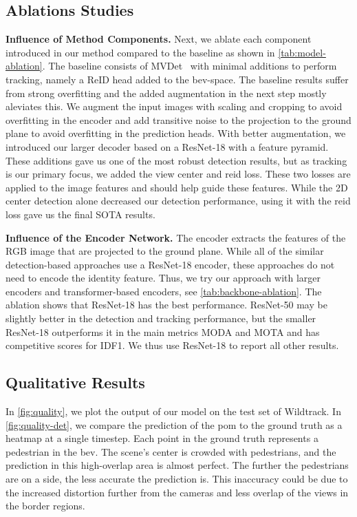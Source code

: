 \documentclass[10pt,twocolumn,letterpaper]{article}
\newcommand{\nparagraph}[1]{\noindent\textbf{#1.  }}
\begin{document}
\subsection{Ablations Studies}
\nparagraph{Influence of Method Components}
Next, we ablate each component introduced in our method compared to the baseline as shown in \cref{tab:model-ablation}. The baseline consists of MVDet~\cite{hou2020multiview} with minimal additions to perform tracking, namely a ReID head added to the \gls{bev}-space. The baseline results suffer from strong overfitting and the added augmentation in the next step mostly aleviates this. We augment the input images with scaling and cropping to avoid overfitting in the encoder and add transitive noise to the projection to the ground plane to avoid overfitting in the prediction heads. With better augmentation, we introduced our larger decoder based on a ResNet-18 with a feature pyramid. These additions gave us one of the most robust detection results, but as tracking is our primary focus, we added the view center and \gls{reid} loss. These two losses are applied to the image features and should help guide these features. While the 2D center detection alone decreased our detection performance, using it with the \gls{reid} loss gave us the final SOTA results.

\nparagraph{Influence of the Encoder Network} The encoder extracts the features of the RGB image that are projected to the ground plane. While all of the similar detection-based approaches \cite{hou2020multiview, hou2021multiview, lee2023multi, qiu20223d} use a ResNet-18 encoder, these approaches do not need to encode the identity feature. Thus, we try our approach with larger encoders and transformer-based encoders, see \cref{tab:backbone-ablation}. The ablation shows that ResNet-18 has the best performance. ResNet-50 may be slightly better in the detection and tracking performance, but the smaller ResNet-18 outperforms it in the main metrics MODA and MOTA and has competitive scores for IDF1. We thus use ResNet-18 to report all other results.




\subsection{Qualitative Results}
In \cref{fig:quality}, we plot the output of our model on the test set of Wildtrack. In \cref{fig:quality-det}, we compare the prediction of the \gls{pom} to the ground truth as a heatmap at a single timestep. Each point in the ground truth represents a pedestrian in the \gls{bev}. The scene's center is crowded with pedestrians, and the prediction in this high-overlap area is almost perfect. The further the pedestrians are on a side, the less accurate the prediction is. This inaccuracy could be due to the increased distortion further from the cameras and less overlap of the views in the border regions. 
\end{document}
